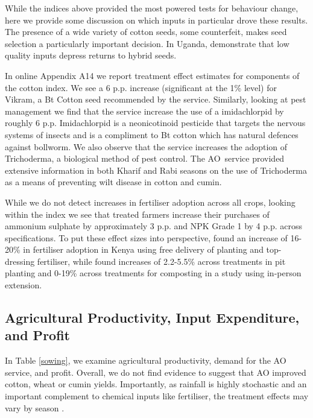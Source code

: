 \documentclass[12pt]{article}
\begin{document}
{While the indices above provided the most powered tests for behaviour change, here we provide some discussion on which inputs in particular drove these results.  The presence of a wide variety of cotton seeds, some counterfeit, makes seed selection a particularly important decision. In Uganda, \citet{bold2015low} demonstrate that low quality inputs depress returns to hybrid seeds.

{\normalsize In online Appendix A14 we report treatment effect estimates for components of the cotton index. We see a 6 p.p. increase (significant at the 1\% level) for Vikram, a Bt Cotton seed recommended by the service.  Similarly, looking at pest management we find that the service increase the use of a imidachlorpid by roughly 6 p.p. Imidachlorpid is a neonicotinoid pesticide that targets the nervous systems of insects and is a compliment to Bt cotton which has natural defences against bollworm. We also observe that the service increases the  adoption of Trichoderma, a biological method of pest control. The AO\ service provided extensive information in both Kharif and Rabi seasons on the use of Trichoderma as a means of preventing wilt disease in cotton and cumin. }

{\normalsize While we do not detect increases in fertiliser adoption across all crops, looking within the index we see that treated farmers increase their purchases of ammonium sulphate by approximately 3 p.p. and NPK Grade 1 by 4 p.p. across specifications. To put these effect sizes into perspective, \citet{DKR_2011} found an increase of
16-20\% in fertiliser adoption in Kenya using free delivery of planting and
top-dressing fertiliser, while \citet{benyishay2013communicating} found
increases of 2.2-5.5\% across treatments in pit planting and 0-19\% across
treatments for composting in a study using in-person extension. }

\subsection{\protect\normalsize Agricultural Productivity, Input Expenditure, and Profit}

{\normalsize In Table \ref*{sowing}, we examine
agricultural productivity, demand for the AO service, and profit. Overall, we do not find evidence to suggest that AO improved cotton, wheat or cumin yields. Importantly, as rainfall is highly stochastic and an important complement to chemical inputs like fertiliser, the treatment effects may vary by season \citep{rosenzweig2020external}. 

}}
\end{document}
